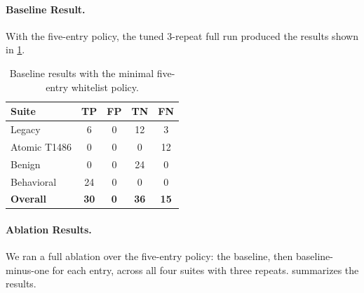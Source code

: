 \documentclass[twocolumn, 10pt]{scrartcl}
\begin{document}
\paragraph{Baseline Result.}
With the five-entry policy, the tuned 3-repeat full run produced the results
shown in \cref{tab:ablation-baseline}.

\begin{table}[htbp]
    \centering
    \small
    \begin{tabular}{lcccc}
    \toprule
    \textbf{Suite} & \textbf{TP} & \textbf{FP} & \textbf{TN} & \textbf{FN} \\
    \midrule
    Legacy       &  6 & 0 & 12 &  3 \\
    Atomic T1486 &  0 & 0 &  0 & 12 \\
    Benign       &  0 & 0 & 24 &  0 \\
    Behavioral   & 24 & 0 &  0 &  0 \\
    \midrule
    \textbf{Overall} & \textbf{30} & \textbf{0} & \textbf{36} & \textbf{15} \\
    \bottomrule
    \end{tabular}
    \caption{Baseline results with the minimal five-entry whitelist policy.}
    \label{tab:ablation-baseline}
\end{table}

\paragraph{Ablation Results.}
We ran a full ablation over the five-entry policy: the baseline, then
baseline-minus-one for each entry, across all four suites with three repeats.
 summarizes the results.
\end{document}

